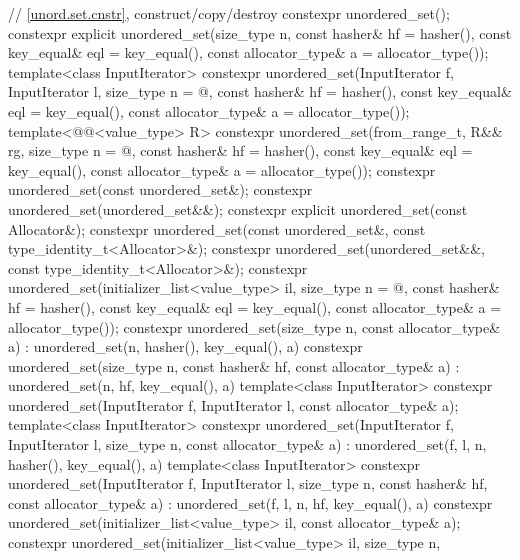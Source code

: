 \begin{codeblock}
{{    // \ref{unord.set.cnstr}, construct/copy/destroy
    constexpr unordered_set();
    constexpr explicit unordered_set(size_type n, const hasher& hf = hasher(),
                                     const key_equal& eql = key_equal(),
                                     const allocator_type& a = allocator_type());
    template<class InputIterator>
      constexpr unordered_set(InputIterator f, InputIterator l,
                              size_type n = @\seebelow@, const hasher& hf = hasher(),
                              const key_equal& eql = key_equal(),
                              const allocator_type& a = allocator_type());
    template<@@<value_type> R>
      constexpr unordered_set(from_range_t, R&& rg,
                              size_type n = @\seebelow@, const hasher& hf = hasher(),
                              const key_equal& eql = key_equal(),
                              const allocator_type& a = allocator_type());
    constexpr unordered_set(const unordered_set&);
    constexpr unordered_set(unordered_set&&);
    constexpr explicit unordered_set(const Allocator&);
    constexpr unordered_set(const unordered_set&, const type_identity_t<Allocator>&);
    constexpr unordered_set(unordered_set&&, const type_identity_t<Allocator>&);
    constexpr unordered_set(initializer_list<value_type> il,
                            size_type n = @\seebelow@, const hasher& hf = hasher(),
                            const key_equal& eql = key_equal(),
                            const allocator_type& a = allocator_type());
    constexpr unordered_set(size_type n, const allocator_type& a)
      : unordered_set(n, hasher(), key_equal(), a) { }
    constexpr unordered_set(size_type n, const hasher& hf, const allocator_type& a)
      : unordered_set(n, hf, key_equal(), a) { }
    template<class InputIterator>
      constexpr unordered_set(InputIterator f, InputIterator l, const allocator_type& a);
    template<class InputIterator>
      constexpr unordered_set(InputIterator f, InputIterator l, size_type n,
                              const allocator_type& a)
        : unordered_set(f, l, n, hasher(), key_equal(), a) { }
    template<class InputIterator>
      constexpr unordered_set(InputIterator f, InputIterator l, size_type n, const hasher& hf,
                              const allocator_type& a)
        : unordered_set(f, l, n, hf, key_equal(), a) { }
    constexpr unordered_set(initializer_list<value_type> il, const allocator_type& a);
    constexpr unordered_set(initializer_list<value_type> il, size_type n,
}}
\end{codeblock}
